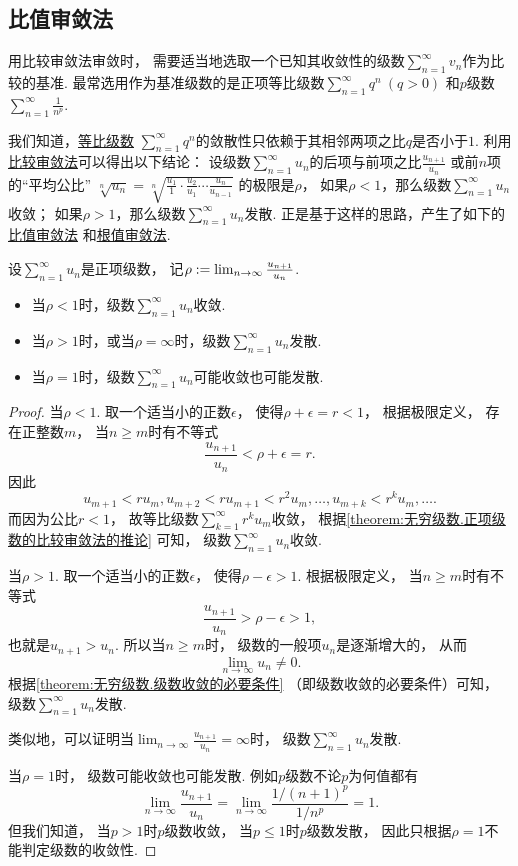 \subsection{比值审敛法}
用比较审敛法审敛时，
需要适当地选取一个已知其收敛性的级数\(\sum_{n=1}^\infty v_n\)作为比较的基准.
最常选用作为基准级数的是正项等比级数\(\sum_{n=1}^\infty q^n\ (q>0)\)
和\(p\)级数\(\sum_{n=1}^\infty \frac1{n^p}\).

我们知道，\hyperref[example:无穷级数.等比级数的收敛性]{等比级数}
\(\sum_{n=1}^\infty q^n\)的敛散性只依赖于其相邻两项之比\(q\)是否小于\(1\).
利用\hyperref[theorem:无穷级数.正项级数的比较审敛法]{比较审敛法}可以得出以下结论：
设级数\(\sum_{n=1}^\infty u_n\)的后项与前项之比\(\frac{u_{n+1}}{u_n}\)
或前\(n\)项的“平均公比”
\(\sqrt[n]{u_n}
= \sqrt[n]{\frac{u_1}1\cdot\frac{u_2}{u_1}\dotsm\frac{u_n}{u_{n-1}}}\)
的极限是\(\rho\)，
如果\(\rho<1\)，那么级数\(\sum_{n=1}^\infty u_n\)收敛；
如果\(\rho>1\)，那么级数\(\sum_{n=1}^\infty u_n\)发散.
正是基于这样的思路，产生了如下的\hyperref[theorem:无穷级数.正项级数的比值审敛法]{比值审敛法}%
和\hyperref[theorem:无穷级数.正项级数的根值审敛法]{根值审敛法}.

\begin{theorem}\label{theorem:无穷级数.正项级数的比值审敛法}
设\(\sum_{n=1}^\infty u_n\)是正项级数，
记\(\rho := \lim_{n\to\infty} \frac{u_{n+1}}{u_n}\).
\begin{itemize}
	\item 当\(\rho<1\)时，级数\(\sum_{n=1}^\infty u_n\)收敛.
	\item 当\(\rho>1\)时，或当\(\rho=\infty\)时，级数\(\sum_{n=1}^\infty u_n\)发散.
	\item 当\(\rho=1\)时，级数\(\sum_{n=1}^\infty u_n\)可能收敛也可能发散.
\end{itemize}
\begin{proof}
当\(\rho<1\).
取一个适当小的正数\(\epsilon\)，
使得\(\rho+\epsilon=r<1\)，
根据极限定义，
存在正整数\(m\)，
当\(n \geq m\)时有不等式\[
	\frac{u_{n+1}}{u_n} < \rho + \epsilon = r.
\]
因此\[
	u_{m+1} < r u_m,
	u_{m+2} < r u_{m+1} < r^2 u_m,
	\dotsc,
	u_{m+k} < r^k u_m,
	\dotsc.
\]
而因为公比\(r<1\)，
故等比级数\(\sum_{k=1}^\infty r^k u_m\)收敛，
根据\cref{theorem:无穷级数.正项级数的比较审敛法的推论} 可知，
级数\(\sum_{n=1}^\infty u_n\)收敛.

当\(\rho>1\).
取一个适当小的正数\(\epsilon\)，
使得\(\rho-\epsilon>1\).
根据极限定义，
当\(n \geq m\)时有不等式\[
	\frac{u_{n+1}}{u_n} > \rho-\epsilon > 1,
\]
也就是\(u_{n+1}>u_n\).
所以当\(n \geq m\)时，
级数的一般项\(u_n\)是逐渐增大的，
从而\[
	\lim_{n\to\infty} u_n \neq 0.
\]
根据\cref{theorem:无穷级数.级数收敛的必要条件} （即级数收敛的必要条件）可知，
级数\(\sum_{n=1}^\infty u_n\)发散.

类似地，可以证明当\(\lim_{n\to\infty} \frac{u_{n+1}}{u_n} = \infty\)时，
级数\(\sum_{n=1}^\infty u_n\)发散.

当\(\rho = 1\)时，
级数可能收敛也可能发散.
例如\(p\)级数不论\(p\)为何值都有\[
	\lim_{n\to\infty} \frac{u_{n+1}}{u_n}
	= \lim_{n\to\infty} \frac{1/(n+1)^p}{1/n^p} = 1.
\]
但我们知道，
当\(p>1\)时\(p\)级数收敛，
当\(p\leq1\)时\(p\)级数发散，
因此只根据\(\rho=1\)不能判定级数的收敛性.
\end{proof}
\end{theorem}

